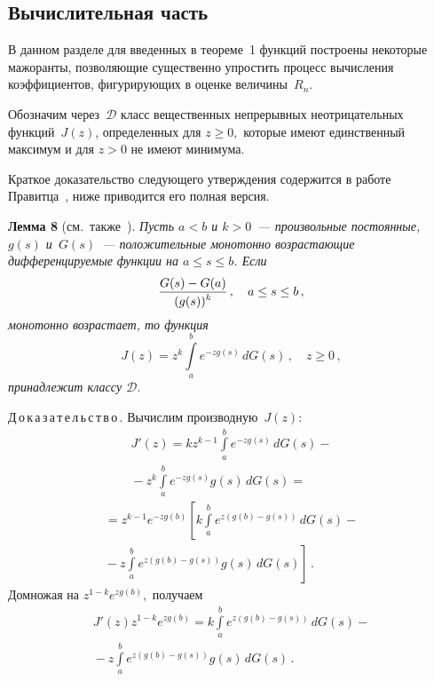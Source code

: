 \begin{multicols}{2}


\section{Вычислительная часть}

В данном разделе для введенных в теореме~1
функций построены некоторые мажоранты, позволяющие существенно
упростить процесс вычисления коэффициентов, фигурирующих в оценке
величины~$R_n$.

Обозначим через~$\mathcal D$ класс вещественных непрерывных
неотрицательных функций~$J(z)$, определенных для $z\ge0,$ которые
имеют единственный максимум и для $z>0$ не имеют минимума.

Краткое доказательство следующего утверждения содержится в работе
Правитца~\cite{Prawitz1975}, ниже приводится его полная версия.

\bigskip

\noindent
\textbf{Лемма 8} (см.\ также~\cite{Prawitz1975}). %
\textit{Пусть $a<b$ и $k>0$~--- произвольные постоянные, $g(s)$ и~$G(s)$~---
положительные монотонно возрастающие дифференцируемые функции на
$a\le s\le b$. Если
$$
\displaystyle\frac{\displaystyle G(s)-G(a)\mathstrut}{\displaystyle (g(s))^k\mathstrut}\,,\quad a\le s\le b\,,
$$
монотонно возрастает, то функция
$$
J(z)=z^k\int\limits_a^b{e^{-zg(s)}\,dG(s)}\,,\quad z\ge0\,,
$$
принадлежит классу $\mathcal D$.}

\bigskip

\noindent
Д\,о\,к\,а\,з\,а\,т\,е\,л\,ь\,с\,т\,в\,о\,.
Вычислим производную~$J(z)$:
\begin{multline*}
J'(z)=kz^{k-1}\int\limits_a^b{e^{-zg(s)}\,dG(s)}-{}\\
{}-
z^k\int\limits_a^b{e^{-zg(s)}g(s)\,dG(s)}={}
\end{multline*}
\begin{multline*}
{}=z^{k-1}e^{-zg(b)}\left[k\int\limits_a^be^{z(g(b)-g(s))}\,dG(s)-{}\right.\\
\left.{}-
z\int\limits_a^b e^{z(g(b)-g(s))}g(s)\,dG(s)\right]\,.
\end{multline*}
Домножая на $z^{1-k}e^{zg(b)},$ получаем
\begin{multline}
J'(z)z^{1-k}e^{zg(b)}=
k\int\limits_a^b{e^{z(g(b)-g(s))}\,dG(s)}-{}\\
{}-z\int\limits_a^b e^{z(g(b)-g(s))}g(s)\,dG(s)\,.
\label{LevChast}
\end{multline}


\end{multicols}
